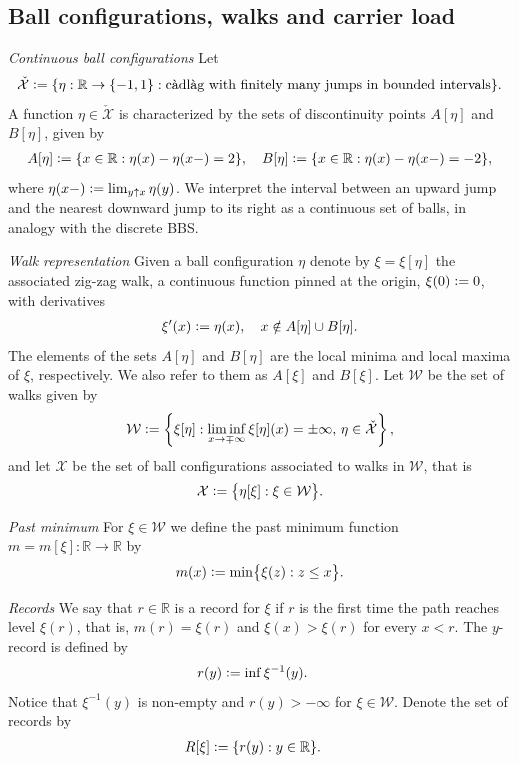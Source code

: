 \documentclass[12pt]{article}
\numberwithin{equation}{section}
\newcommand{\parrafo}[1]{{\noindent \emph{#1}\;\;}}
\newcommand{\RR}{\mathbb R}
\newcommand{\cX}{\mathcal X}
\newcommand{\cW}{\mathcal W}
\newcommand{\cXz}{{\check{\mathcal X}}}
\begin{document}
\subsection{Ball configurations, walks and carrier load}
\label{ss11}

\parrafo{Continuous ball configurations} Let
\begin{align*}
  \cXz\vcentcolon =
  \{\eta:\RR\to\{-1, 1\}: \text{càdlàg with finitely many jumps in bounded intervals}\}.
\end{align*}
A function $\eta\in\cXz$ is characterized by the sets of discontinuity points $A[\eta]$ and $B[\eta]$, given by
\begin{align}
 \label{ab1}
 A[\eta] \vcentcolon = \{x\in\RR: \eta(x)-\eta(x-)=2\}, \quad B[\eta] \vcentcolon= \{x\in\RR: \eta(x)-\eta(x-)=-2\},
\end{align}
where $\eta(x-)\vcentcolon =\lim_{y\uparrow x} \eta(y)$. 
We interpret the interval between an upward jump and the nearest downward jump to its right as a continuous set of balls, in analogy with the discrete BBS.

\parrafo{Walk representation} Given a ball configuration $\eta$ denote by  $\xi=\xi[\eta]$ the associated zig-zag walk, a continuous function pinned at the origin, $\xi(0)\vcentcolon =0$, with derivatives
\begin{align}
 \xi'(x) \vcentcolon = \eta(x), \quad x\notin A[\eta]\cup B[\eta]. \label{z23}
\end{align}
The elements of the sets $A[\eta]$ and $B[\eta]$ are the local minima and local maxima of $\xi$, respectively. We also refer to them as $A[\xi]$ and $B[\xi]$. 
Let $\cW$ be the set of walks given by
\begin{align}
  \cW \vcentcolon=\left\{\xi[\eta]: \liminf_{x\to\mp\infty} \xi[\eta](x) = \pm \infty, \,\eta\in\cXz\right\}, \label{cZ}
\end{align}
and let $\cX$ be the set of ball configurations associated to walks in $\cW$, that is
\begin{align}
\cX \vcentcolon = \bigl\{\eta[\xi]: \xi\in \cW\bigr\}. \label{cX}
\end{align}


\parrafo{Past minimum} For $\xi\in\cW$ we define the past minimum function $m=m[\xi]:\RR\to \RR$ by 
\begin{align}
 \label{lm9}
 m(x) \vcentcolon= \min\bigl\{\xi(z):z\le x\bigr\}.
\end{align}

\parrafo{Records} We say that $r\in\RR$ is a record for $\xi$ if $r$ is the first time the path reaches level $\xi(r)$, that is, $m(r)=\xi(r)$ and $\xi(x)>\xi(r)$ for every $x<r$. The $y$-record is defined by
\begin{align}
 \label{rec1}
 r(y) &\vcentcolon= \inf \xi^{-1}(y).
\end{align}
Notice that $\xi^{-1}(y)$ is non-empty and $r(y)>-\infty$ for $\xi\in\cW$.
Denote the set of records by
\begin{align}
  \label{R28}
 R[\xi]&\vcentcolon= \{r(y):y\in\RR\}.
\end{align}
\end{document}
